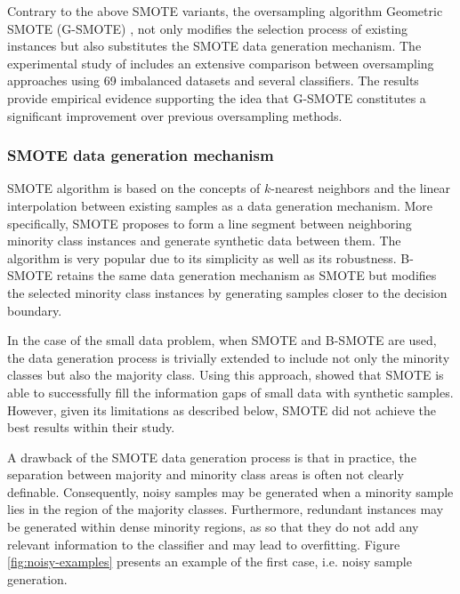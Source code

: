 Contrary to the above SMOTE variants, the oversampling algorithm Geometric SMOTE (G-SMOTE) \cite{Douzas.2019}, not only modifies the selection process of existing instances but also substitutes the SMOTE data generation mechanism. The experimental study of \cite{Douzas.2019} includes an extensive comparison between oversampling approaches using 69 imbalanced datasets and several classifiers. The results provide empirical evidence supporting the idea that G-SMOTE constitutes a significant improvement over previous oversampling methods.

\subsubsection{SMOTE data generation mechanism}
\label{SMOTE}

 SMOTE algorithm is based on the concepts of \( k \)-nearest neighbors and the linear interpolation between existing samples as a data generation mechanism. More specifically, SMOTE proposes to form a line segment between neighboring minority class instances and generate synthetic data between them. The algorithm is very popular due to its simplicity as well as its robustness. B-SMOTE retains the same data generation mechanism as SMOTE but modifies the selected minority class instances by generating samples closer to the decision boundary. 
 
 In the case of the small data problem, when SMOTE and B-SMOTE are used, the data generation process is trivially extended to include not only the minority classes but also the majority class. Using this approach, \cite{Li.2018} showed that SMOTE is able to successfully fill the information gaps of small data with synthetic samples. However, given its limitations as described below, SMOTE did not achieve the best results within their study.

A drawback of the SMOTE data generation process is that in practice, the separation between majority and minority class areas is often not clearly definable. Consequently, noisy samples may be generated when a minority sample lies in the region of the majority classes. Furthermore, redundant instances may be generated within dense minority regions, as so that they do not add any relevant information to the classifier and may lead to overfitting. Figure \ref{fig:noisy-examples} presents an example of the first case, i.e. noisy sample generation.


